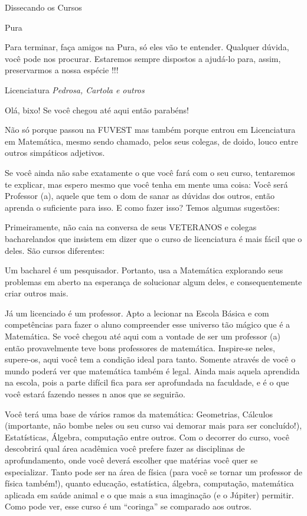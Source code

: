 \begin{secao}{Dissecando os Cursos}
\begin{subsecao}{Pura}
\begin{enumerate}
\end{enumerate}
Para terminar, faça amigos na Pura, só eles vão te entender. Qualquer dúvida, você pode nos procurar. Estaremos sempre dispostos a ajudá-lo para, assim, preservarmos a nossa espécie !!!

\end{subsecao}

\begin{subsecao}{Licenciatura}
{\em Pedrosa, Cartola e outros}

Olá, bixo! Se você chegou até aqui então parabéns!

Não só porque passou na FUVEST mas também porque entrou em Licenciatura em Matemática, mesmo sendo chamado, pelos seus colegas, de doido, louco entre outros simpáticos adjetivos.

Se você ainda não sabe exatamente o que você fará com o seu curso, tentaremos te explicar, mas espero mesmo que você tenha em mente uma coisa: Você será Professor (a), aquele que tem o dom de sanar as dúvidas dos outros, então aprenda o suficiente para isso. E como fazer isso? Temos algumas sugestões:

Primeiramente, não caia na conversa de seus VETERANOS e colegas bacharelandos que insistem em dizer que o curso de licenciatura é mais fácil que o deles. São cursos diferentes:

Um bacharel é um pesquisador. Portanto, usa a Matemática explorando seus problemas em aberto na esperança de solucionar algum deles, e consequentemente criar outros mais.

Já um licenciado é um professor. Apto a lecionar na Escola Básica e com competências para fazer o aluno compreender esse universo tão mágico que é a Matemática. Se você chegou até aqui com a vontade de ser um professor (a) então provavelmente teve bons professores de matemática. Inspire-se neles, supere-os, aqui você tem a condição ideal para tanto. Somente através de você o mundo poderá ver que matemática também é legal. Ainda mais aquela aprendida na escola, pois a parte difícil fica para ser aprofundada na faculdade, e é o que você estará fazendo nesses n anos que se seguirão.

Você terá uma base de vários ramos da matemática: Geometrias, Cálculos (importante, não bombe neles ou seu curso vai demorar mais para ser concluído!), Estatísticas, Álgebra, computação entre outros. Com o decorrer do curso, você descobrirá qual área acadêmica você prefere fazer as disciplinas de aprofundamento, onde você deverá escolher que matérias você quer se especializar. Tanto pode ser na área de física (para você se tornar um professor de física também!), quanto educação, estatística, álgebra, computação, matemática aplicada em saúde animal e o que mais a sua imaginação (e o Júpiter) permitir. Como pode ver, esse curso é um “coringa” se comparado aos outros.


\end{subsecao}
\end{secao}

